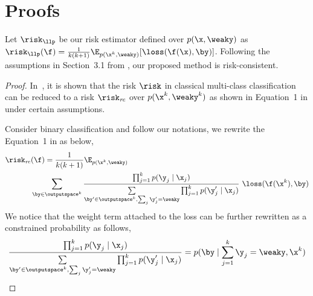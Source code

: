 \documentclass{article}
\begin{document}
\section{Proofs}
\label{sec:proofs}
\begin{lemma}
\label{thm: lemma}
Let $\risk_{\llp}$ be our risk estimator defined over $p(\x, \weaky)$ as
$\risk_{\llp}(\f) = \frac{1}{k(k + 1)} \E_{p(\x^k, \weaky)}[\loss(\f(\x), \by)]$.
Following the assumptions in Section~3.1 from \citet{kobayashi2022risk},
our proposed method is risk-consistent.
\end{lemma}
\begin{proof}
In~\citet{kobayashi2022risk},
it is shown that the risk $\risk$ in classical multi-class classification can be reduced to a risk $\risk_{\mathit{rc}}$ over $p(\x^k, \weaky^k)$ as shown in Equation~1 in \citet{kobayashi2022risk} under certain assumptions.

Consider binary classification and follow our notations, we rewrite the Equation~1 in \citet{kobayashi2022risk} as below,
\begin{equation*}
\begin{split}
    \risk_{\mathit{rc}}
    &(\f) = 
    \frac{1}{k(k + 1)} \E_{p(\x^k, \weaky)} \\
    &\sum_{\by \in \outputspace^k} 
    \frac{\prod_{j = 1}^k p(\y_j \mid \x_j)}{\sum\limits_{\by^\prime \in \outputspace^k, \sum_j \y_j^\prime = \weaky} \prod_{j=1}^k p(\y_j^\prime \mid \x_j)}
    ~\loss(\f(\x^k), \by)
\end{split}
\end{equation*}
We notice that the weight term attached to the loss can be further rewritten as a constrained probability as follows,
\begin{equation*}
    \frac{\prod_{j = 1}^k p(\y_j \mid \x_j)}{\sum\limits_{\by^\prime \in \outputspace^k, \sum_j \y_j^\prime = \weaky} \prod_{j=1}^k p(\y_j^\prime \mid \x_j)} 
    = p(\by \mid \sum_{j = 1}^k \y_j = \weaky, \x^k)
\end{equation*}


\end{proof}
\end{document}
